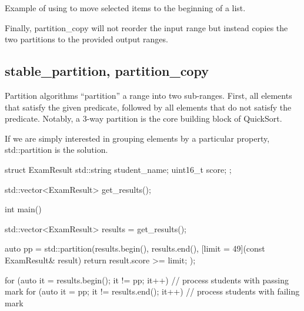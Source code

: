 
\begin{box-note}
\footnotesize Example of using  to move selected items to the beginning of a list.
\tcblower
{}
\end{box-note}




Finally, partition\_copy will not reorder the input range but instead copies the two partitions to the provided output ranges.

\subsection{\texorpdfstring{}{\texttt{std::is\_partitioned}}}

\subsection{stable\_partition, partition\_copy}

Partition algorithms “partition” a range into two sub-ranges. First, all elements that satisfy the given predicate, followed by all elements that do not satisfy the predicate. Notably, a 3-way partition is the core building block of QuickSort.



If we are simply interested in grouping elements by a particular property, std::partition is the solution.

\begin{box-note}
\begin{cppcode}
struct ExamResult {
    std::string student_name;
    uint16_t score;
};

std::vector<ExamResult> get_results();

int main() {
    std::vector<ExamResult> results = get_results();
  
    auto pp = std::partition(results.begin(), results.end(), 
        [limit = 49](const ExamResult& result) {
            return result.score >= limit;
        });
 
    for (auto it = results.begin(); it != pp; it++) {
        // process students with passing mark
    }
    for (auto it = pp; it != results.end(); it++) {
        // process students with failing mark
     }
}
\end{cppcode}
\end{box-note}

